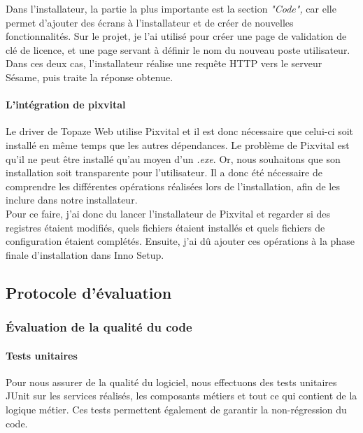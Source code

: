 Dans l'installateur, la partie la plus importante est la section \textit{"Code",} car elle permet d'ajouter des écrans à l'installateur et de créer de nouvelles fonctionnalités. Sur le projet, je l'ai utilisé pour créer une page de validation de clé de licence, et une page servant à définir le nom du nouveau poste utilisateur.\\
Dans ces deux cas, l'installateur réalise une requête HTTP vers le serveur Sésame, puis traite la réponse obtenue. 

\paragraph*{L'intégration de pixvital\\}


Le driver de Topaze Web utilise Pixvital et il est donc nécessaire que celui-ci soit installé en même temps que les autres dépendances. Le problème de Pixvital est qu'il ne peut être installé qu'au moyen d'un \textit{.exe}. Or, nous souhaitons que son installation soit transparente pour l'utilisateur. Il a donc été nécessaire de comprendre les différentes opérations réalisées lors de l'installation, afin de les inclure dans notre installateur.\\
Pour ce faire, j'ai donc du lancer l'installateur de Pixvital et regarder si des registres étaient modifiés, quels fichiers étaient installés et quels fichiers de configuration étaient complétés. Ensuite, j'ai dû ajouter ces opérations à la phase finale d'installation dans Inno Setup.

\subsection{Protocole d'évaluation}
\subsubsection{Évaluation de la qualité du code}
\paragraph*{Tests unitaires\\}
Pour nous assurer de la qualité du logiciel, nous effectuons des tests unitaires JUnit sur les services réalisés, les composants métiers et tout ce qui contient de la logique métier. Ces tests permettent également de garantir la non-régression du code.

